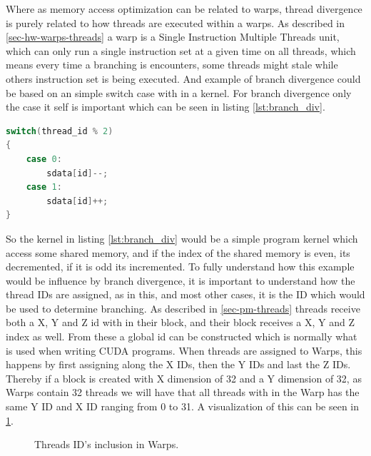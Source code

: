 Where as memory access optimization can be related to warps, thread divergence is purely related to how threads are executed within a warps. As described in \cref{sec-hw-warps-threads} a warp is a Single Instruction Multiple Threads unit, which can only run a single instruction set at a given time on all threads, which means every time a branching is encounters, some threads might stale while others instruction set is being executed. And example of branch divergence could be based on an simple switch case with in a kernel. For branch divergence only the case it self is important which can be seen in listing \ref{lst:branch_div}.\\

\begin{lstlisting}[language=C,caption={Dividing threads into warps, using modulus operator},label=lst:branch_div]
switch(thread_id % 2)
{
	case 0:
		sdata[id]--;
	case 1:
		sdata[id]++;
}
\end{lstlisting} 

So the kernel in listing \ref{lst:branch_div} would be a simple program kernel which access some shared memory, and if the index of the shared memory is even, its decremented, if it is odd its incremented. To fully understand how this example would be influence by branch divergence, it is important to understand how the thread IDs are assigned, as in this, and most other cases, it is the ID which would be used to determine branching. As described in \cref{sec-pm-threads} threads receive both a X, Y and Z id with in their block, and their block receives a X, Y and Z index as well. From these a global id can be constructed which is normally what is used when writing CUDA programs. When threads are assigned to Warps, this happens by first assigning along the X IDs, then the Y IDs and last the Z IDs. Thereby if a block is created with X dimension of 32 and a Y dimension of 32, as Warps contain 32 threads we will have that all threads with in the Warp has the same Y ID and X ID ranging from 0 to 31. A visualization of this can be seen in \cref{fig:id_warp}.\\

\begin{figure}[ht]
	\centering
	\caption{Threads ID's inclusion in Warps.}
	\label{fig:id_warp}
\end{figure}

